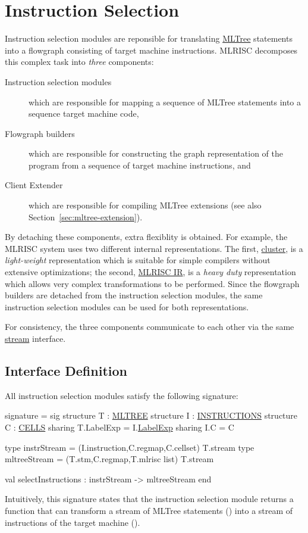 \section{Instruction Selection} \label{sec:instrsel}
Instruction selection modules are reponsible for translating 
\href{mltree.html}{MLTree} statements into a flowgraph consisting
of target machine instructions.  MLRISC decomposes this complex task 
into \emph{three} components:
\begin{description}
   \item[Instruction selection modules] which are responsible for
mapping a sequence of MLTree statements into a sequence target machine code,
   \item[Flowgraph builders]  which are responsible for constructing
the graph representation of the program from a sequence of target machine
instructions, and
   \item[Client Extender] which are responsible for compiling 
MLTree extensions (see also Section~\ref{sec:mltree-extension}).
\end{description}
By detaching these components, extra flexiblity is obtained.  For example,
the MLRISC system uses two different internal representations.  The
first, \href{cluster.html}{cluster}, is a \emph{light-weight} representation
which is suitable for simple compilers without extensive 
optimizations; the second, \href{mlrisc-ir.html}{MLRISC IR}, is a 
\emph{heavy duty} representation which allows very complex transformations
to be performed.  Since the flowgraph builders are detached from the
instruction selection modules, the same instruction selection modules
can be used for both representations.  

For consistency, the three components communicate to each other 
via the same \href{stream.html}{stream} interface.

\subsection{Interface Definition}
All instruction selection modules satisfy the following signature:

\begin{SML}
signature  = 
sig
   structure T : \href{mltree.html}{MLTREE}
   structure I : \href{instructions.html}{INSTRUCTIONS}
   structure C : \href{cells.html}{CELLS}
      sharing T.LabelExp = I.\href{labelexp.html}{LabelExp}
      sharing I.C = C

   type instrStream = (I.instruction,C.regmap,C.cellset) T.stream
   type mltreeStream = (T.stm,C.regmap,T.mlrisc list) T.stream

   val selectInstructions : instrStream -> mltreeStream
end
\end{SML}
Intuitively, this signature states that
the instruction selection module 
returns a function that can transform a stream of MLTree statements 
() into a stream of instructions of the target 
machine ().  

